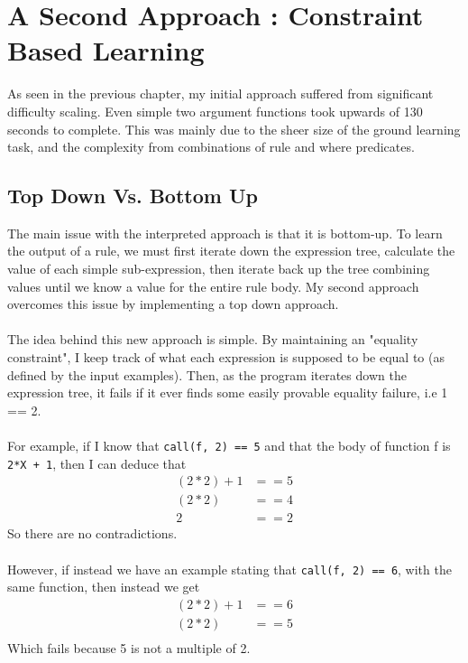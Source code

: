 \chapter{A Second Approach : Constraint Based Learning}

As seen in the previous chapter, my initial approach suffered from significant difficulty scaling. Even simple two argument functions took upwards of 130 seconds to complete. This was mainly due to the sheer size of the ground learning task, and the complexity from combinations of rule and where predicates.

\section{Top Down Vs. Bottom Up}
The main issue with the interpreted approach is that it is bottom-up. To learn the output of a rule, we must first iterate down the expression tree, calculate the value of each simple sub-expression, then iterate back up the tree combining values until we know a value for the entire rule body. My second approach overcomes this issue by implementing a top down approach. \\ \\
The idea behind this new approach is simple. By maintaining an "equality constraint", I keep track of what each expression is supposed to be equal to (as defined by the input examples). Then, as the program iterates down the expression tree, it fails if it ever finds some easily provable equality failure, i.e 1 == 2. \\ \\
For example, if I know that \lstinline{call(f, 2) == 5} and that the body of function f is \lstinline{2*X + 1}, then I can deduce that 
\begin{align*}
(2*2) + 1 &== 5 \\
(2*2) &== 4 \\
2 &== 2
\end{align*}
So there are no contradictions. \\ \\
However, if instead we have an example stating that \lstinline{call(f, 2) == 6}, with the same function, then instead we get %
\begin{align*}
(2*2) + 1 &== 6 \\
(2*2) &== 5 \\
\end{align*}
Which fails because 5 is not a multiple of 2.

